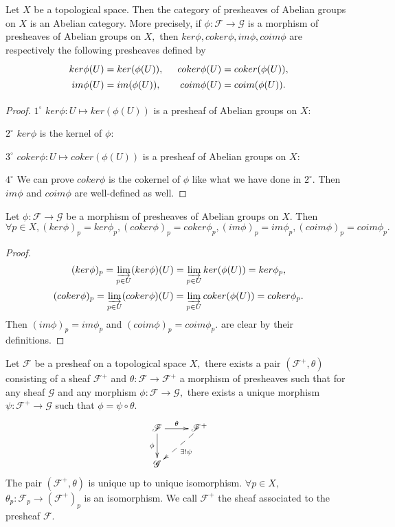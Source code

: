 \begin{prop}
Let $X$ be a topological space. Then the category of presheaves of
Abelian groups on $X$ is an Abelian category. More precisely, if
$\phi: \mathscr{F}\rightarrow \mathscr{G}$ is a morphism of
presheaves of Abelian groups on $X,$ then $ker\phi, coker\phi,
im\phi, coim\phi$ are respectively the following presheaves defined
by
\[ \xymatrix@R=0em@C=1em{
   ker\phi(U)=ker(\phi(U)), & coker\phi(U)=coker(\phi(U)),\\
   im\phi(U)=im(\phi(U)), & coim\phi(U)=coim(\phi(U)). }  \]
\end{prop}
\begin{proof}
$\mathit{1^{\circ}}$ $ker\phi: U\mapsto ker(\phi(U))$ is a presheaf
of Abelian groups on $X:$

$\mathit{2^{\circ}}$ $ker\phi$ is the kernel of $\phi:$

$\mathit{3^{\circ}}$ $coker\phi: U\mapsto coker(\phi(U))$ is a
presheaf of Abelian groups on $X:$

$\mathit{4^{\circ}}$ We can prove $coker\phi$ is the cokernel of
$\phi$ like what we have done in $\mathit{2^{\circ}}.$ Then $im\phi$
and $coim\phi$ are well-defined as well.
\end{proof}
\begin{cor}
Let $\phi: \mathscr{F}\rightarrow \mathscr{G}$ be a morphism of
presheaves of Abelian groups on $X.$ Then $\forall p\in X,
(ker\phi)_p=ker\phi_p, (coker\phi)_p=coker\phi_p,
(im\phi)_p=im\phi_p, (coim\phi)_p=coim\phi_p.$
\end{cor}
\begin{proof}
$$(ker\phi)_p = \varinjlim\limits_{p\in U}(ker\phi)(U) = \varinjlim\limits_{p\in
U}ker(\phi(U)) = ker\phi_p,$$
$$(coker\phi)_p = \varinjlim\limits_{p\in U}(coker\phi)(U) = \varinjlim\limits_{p\in
U}coker(\phi(U)) = coker\phi_p.$$ Then $(im\phi)_p=im\phi_p$ and
$(coim\phi)_p=coim\phi_p.$ are clear by their definitions.
\end{proof}
\begin{prop}
Let $\mathscr{F}$ be a presheaf on a topological space $X,$ there
exists a pair $(\mathscr{F}^+,\theta)$ consisting of a sheaf
$\mathscr{F}^+$ and $\theta: \mathscr{F}\rightarrow \mathscr{F}^+$ a
morphism of presheaves such that for any sheaf $\mathscr{G}$ and any
morphism $\phi: \mathscr{F}\rightarrow \mathscr{G},$ there exists a
unique morphism $\psi: \mathscr{F}^+\rightarrow \mathscr{G}$ such
that $\phi=\psi\circ\theta.$
\[ \xymatrix{
   \mathscr{F} \ar[r]^-{\theta} \ar[d]_-{\phi} & \mathscr{F}^+
   \ar@{-->}[dl]^-{\exists! \psi}                           \\
   \mathscr{G} }  \]
The pair $(\mathscr{F}^+,\theta)$ is unique up to unique
isomorphism. $\forall p\in X,$ $\theta_p: \mathscr{F}_p\rightarrow
(\mathscr{F}^+)_p$ is an isomorphism. We call $\mathscr{F}^+$ the
sheaf associated to the presheaf $\mathscr{F}.$
\end{prop}
